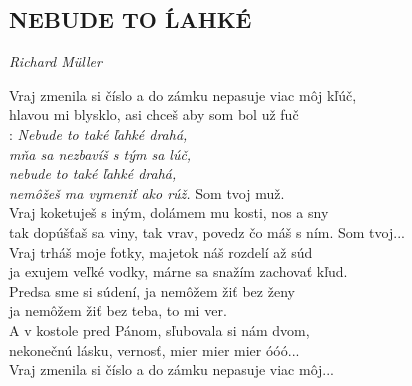 \begin{flushleft}
	\section*{\Huge NEBUDE TO ĹAHKÉ}
	\emph{Richard Müller}
\end{flushleft}

Vraj zmenila si číslo a do zámku nepasuje viac môj kľúč,\\
hlavou mi blysklo, asi chceš aby som bol už fuč\\

\textregistered: \emph{Nebude to také ľahké drahá,\\
mňa sa nezbavíš s tým sa lúč,\\
nebude to také ľahké drahá,\\
nemôžeš ma vymeniť ako rúž.} \hspace{0.4cm} Som tvoj muž.\\

Vraj koketuješ s iným, dolámem mu kosti, nos a sny\\
tak dopúšťaš sa viny, tak vrav, povedz čo máš s ním. \textregistered \hspace{0.2cm} Som tvoj...\\

Vraj trháš moje fotky, majetok náš rozdelí až súd\\
ja exujem veľké vodky, márne sa snažím zachovať kľud. \textregistered\\

Predsa sme si súdení, ja nemôžem žiť bez ženy\\
ja nemôžem žiť bez teba, to mi ver.\\
A v kostole pred Pánom, sľubovala si nám dvom,\\ nekonečnú lásku, vernosť, mier mier mier óóó...  \textregistered\\

Vraj zmenila si číslo a do zámku nepasuje viac môj...
\newpage

